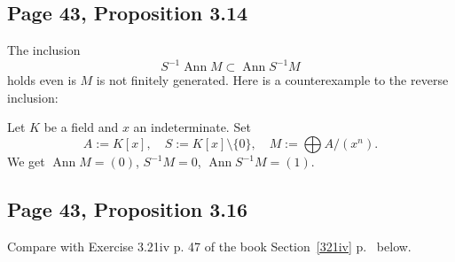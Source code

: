 \documentclass[parskip=half,fontsize=12pt]{scrartcl}%
\newcommand{\oo}{\operatorname}\newcommand{\ooo}{\operatorname*}
\newcommand{\mf}{\mathfrak}
\newcommand{\ppp}{\mf p}
\newcommand{\qqq}{\mf q}
\begin{document}
\begin{comment}
\emph{Let $U$ be the set of prime ideals of $A$ disjoint from $S$ and $V$ the set of prime ideals of $S^{-1}A$. Then the maps $U\to V$, $\ppp\mapsto S^{-1}\ppp$ and $V\to U$, $\qqq\mapsto \qqq^{\oo c}$ are well-defined inverse bijections.} 

\emph{Proof.}

$\mf q\in V\implies\mf q^{\oo c}\in U$: It suffices to check that $\mf q^{\oo c}$ is disjoint from $S$. If $s$ is in $S\cap\mf q^{\oo c}$, then $s/1$ is in $\mf q$, which is impossible since $s/1$ is a unit.

$\ppp\in U\implies\ppp^{\oo e}\in V$: As written in the book, ``if $\ppp$ is a prime ideal in $A$, then $A/\ppp$ is an integral domain; if $\overline S$ is the image of $S$ in $A/\ppp$, we have $S^{-1}A/S^{-1}\ppp\simeq\overline S^{-1}(A/\ppp)$ which is either $0$ or else is contained in the field of fractions of $A/\ppp$ and is therefore an integral domain, and therefore $\overline S^{-1}(A/\ppp)$ is either prime or is the unit ideal; by i) the latter possibility occurs if and only if $\ppp$ meets $S$.'' Instead of ``by i)'', I would say ``by \eqref{s-1a}''.

$\ppp^{\oo{ec}}=\ppp$ for $\ppp\in U$: It suffices to show $\ppp^{\oo{ec}}\subset\ppp$. Let $s$ be in $S$. In view of Proposition 3.11 (ii), it suffices to show $(\ppp:s)\subset\ppp$, which is easy.

$\mf q^{\oo{ce}}=\mf q$ for $\mf q\in V$: This is a particular case of Part (i). $\square$
\end{comment}

\subsection{Page 43, Proposition 3.14}%

The inclusion 
$$
S^{-1}\oo{Ann}M\subset\oo{Ann}S^{-1}M
$$ 
holds even is $M$ is not finitely generated. Here is a counterexample to the reverse inclusion:

Let $K$ be a field and $x$ an indeterminate. Set 
$$
A:=K[x],\quad S:=K[x]\setminus\{0\},\quad M:=\bigoplus A/(x^n).
$$ 
We get $\oo{Ann}M=(0)$, $S^{-1}M=0$, $\oo{Ann}S^{-1}M=(1)$. 

\subsection{Page 43, Proposition 3.16}%

Compare with Exercise 3.21iv p. 47 of the book Section~\ref{321iv} p.~\pageref{321iv} below.
\end{document}
